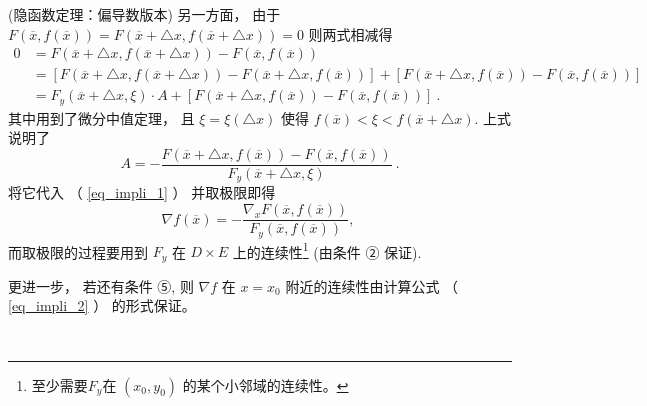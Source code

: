 \begin{theorem}{(隐函数定理：偏导数版本)}
另一方面， 由于 $F(\overline{x},f(\overline{x}))=F(\overline{x}+\triangle x,f(\overline{x}+\triangle x))=0$
则两式相减得
\begin{equation}
\begin{aligned}
0 & = F(\overline{x}+\triangle x,f(\overline{x}+\triangle x))-F(\overline{x},f(\overline{x}))\\
 & = \left[F(\overline{x}+\triangle x,f(\overline{x}+\triangle x))-F(\overline{x}+\triangle x,f(\overline{x}))\right]+\left[F(\overline{x}+\triangle x,f(\overline{x}))-F(\overline{x},f(\overline{x}))\right]\\
 & = F_{y}(\overline{x}+\triangle x,\xi)\cdot A+\left[F(\overline{x}+\triangle x,f(\overline{x}))-F(\overline{x},f(\overline{x}))\right]~.
\end{aligned}
\end{equation}
其中用到了微分中值定理， 且 $\xi=\xi(\triangle x)$ 使得 $f(\overline{x})<\xi<f(\overline{x}+\triangle x)$.
上式说明了 
$$
A=-{\displaystyle \frac{F(\overline{x}+\triangle x,f(\overline{x}))-F(\overline{x},f(\overline{x}))}{F_{y}(\overline{x}+\triangle x,\xi)}}~.
$$
将它代入 （ \autoref{eq_impli_1} ） 并取极限即得 
\begin{equation}\label{eq_impli_2}
\nabla f(\overline{x})=-{\displaystyle \frac{\nabla_{x}F(\overline{x},f(\overline{x}))}{F_{y}(\overline{x},f(\overline{x}))},}~
\end{equation}
而取极限的过程要用到 $F_{y}$ 在 $D\times E$ 上的连续性\footnote{至少需要$F_y$在 $(x_0,y_0)$ 的某个小邻域的连续性。} (由条件 ② 保证). 

更进一步， 若还有条件 ⑤, 则 $\nabla f$ 在 $x=x_{0}$ 附近的连续性由计算公式 （ \autoref{eq_impli_2} ） 的形式保证。 
 \end{theorem}

\verb| |

